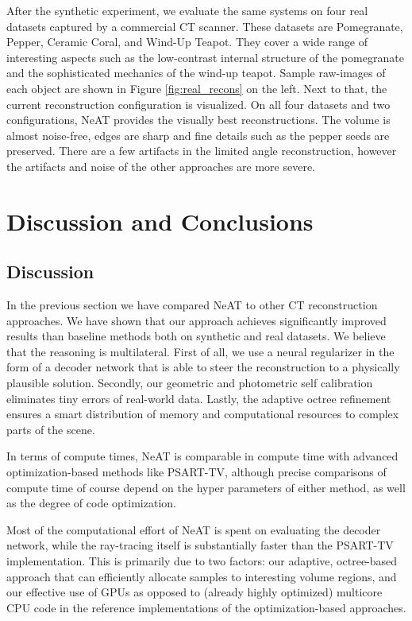 \documentclass[acmtog,nonacm]{acmart} \acmSubmissionID{0438}
\newcommand{\neat}{NeAT\xspace}
\begin{document}
After the synthetic experiment, we evaluate the same systems on four real datasets captured by a commercial CT scanner.
These datasets are Pomegranate, Pepper, Ceramic Coral, and Wind-Up Teapot.
They cover a wide range of interesting aspects such as the low-contrast internal structure of the pomegranate and the sophisticated mechanics of the wind-up teapot. 
Sample raw-images of each object are shown in Figure \ref{fig:real_recons} on the left.
Next to that, the current reconstruction configuration is visualized. 
On all four datasets and two configurations, NeAT provides the visually best reconstructions.
The volume is almost noise-free, edges are sharp and fine details such as the pepper seeds are preserved.
There are a few artifacts in the limited angle reconstruction, however the artifacts and noise of the other approaches are more severe. 
\section{Discussion and Conclusions}
\label{sec:discuss}

\subsection{Discussion}
In the previous section we have compared \neat to other CT reconstruction approaches.
We have shown that our approach achieves significantly improved results than baseline methods both on synthetic and real datasets. We believe that the reasoning is multilateral.
First of all, we use a neural regularizer in the form of a decoder network that is able to steer the reconstruction to a physically plausible solution. 
Secondly, our geometric and photometric self calibration eliminates tiny errors of real-world data.
Lastly, the adaptive octree refinement ensures a smart distribution of memory and computational resources to complex parts of the scene.

In terms of compute times, \neat is comparable in compute time with
advanced optimization-based methods like PSART-TV, although precise
comparisons of compute time of course depend on the hyper parameters of
either method, as well as the degree of code optimization. 

Most of the computational effort of \neat is spent on evaluating the
decoder network, while the ray-tracing itself is substantially faster
than the PSART-TV implementation. This is primarily due to two factors:
our adaptive, octree-based approach that can efficiently allocate
samples to interesting volume regions, and our effective use of GPUs
as opposed to (already highly optimized) multicore CPU code in the
reference implementations of the optimization-based approaches.
\end{document}

